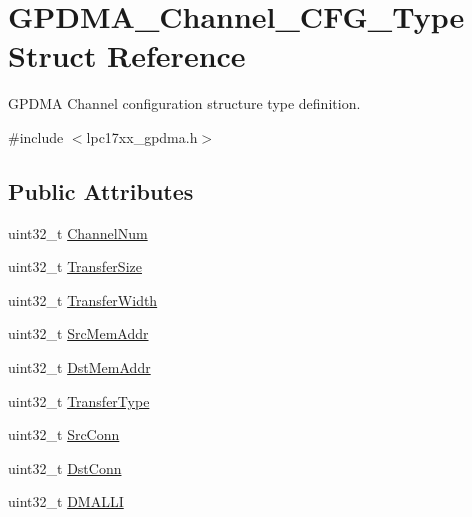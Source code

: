 \hypertarget{struct_g_p_d_m_a___channel___c_f_g___type}{\section{\-G\-P\-D\-M\-A\-\_\-\-Channel\-\_\-\-C\-F\-G\-\_\-\-Type \-Struct \-Reference}
\label{struct_g_p_d_m_a___channel___c_f_g___type}
}


\-G\-P\-D\-M\-A \-Channel configuration structure type definition.  




{\ttfamily \#include $<$lpc17xx\-\_\-gpdma.\-h$>$}

\subsection*{\-Public \-Attributes}
\begin{DoxyCompactItemize}
\item 
uint32\-\_\-t \hyperlink{struct_g_p_d_m_a___channel___c_f_g___type_a1ea2186835438ed661be2dd46e7f5658}{\-Channel\-Num}
\item 
uint32\-\_\-t \hyperlink{struct_g_p_d_m_a___channel___c_f_g___type_acce3ec0eb7297d4294b7038eca4a90f1}{\-Transfer\-Size}
\item 
uint32\-\_\-t \hyperlink{struct_g_p_d_m_a___channel___c_f_g___type_aefd7f203fe445e20b266dba772df844d}{\-Transfer\-Width}
\item 
uint32\-\_\-t \hyperlink{struct_g_p_d_m_a___channel___c_f_g___type_a758e9a95071bee63639938563c837520}{\-Src\-Mem\-Addr}
\item 
uint32\-\_\-t \hyperlink{struct_g_p_d_m_a___channel___c_f_g___type_a1423fbb915f781a0ce6969252ed146cd}{\-Dst\-Mem\-Addr}
\item 
uint32\-\_\-t \hyperlink{struct_g_p_d_m_a___channel___c_f_g___type_ab3090bb6d00e2733ddce843b54714f71}{\-Transfer\-Type}
\item 
uint32\-\_\-t \hyperlink{struct_g_p_d_m_a___channel___c_f_g___type_a1b813afe8cc41880be405d7f598cedf0}{\-Src\-Conn}
\item 
uint32\-\_\-t \hyperlink{struct_g_p_d_m_a___channel___c_f_g___type_a98809e20455f460ac2b481595b189102}{\-Dst\-Conn}
\item 
uint32\-\_\-t \hyperlink{struct_g_p_d_m_a___channel___c_f_g___type_aadc8a728668610d303bca502add539b1}{\-D\-M\-A\-L\-L\-I}
\end{DoxyCompactItemize}


